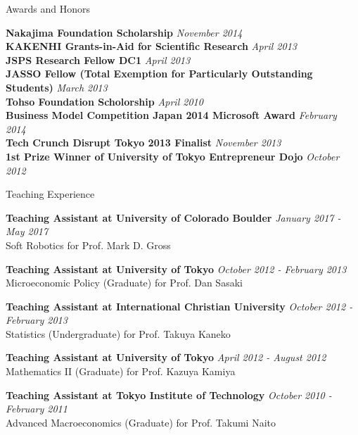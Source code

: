 \documentclass{resume} %
\begin{document}
\begin{rSection}{Awards and Honors}

{\bf Nakajima Foundation Scholarship} \hfill {\em November 2014} \\
{\bf KAKENHI Grants-in-Aid for Scientific Research} \hfill {\em April 2013} \\
{\bf JSPS Research Fellow DC1} \hfill {\em April 2013} \\
{\bf JASSO Fellow (Total Exemption for Particularly Outstanding Students) } \hfill {\em March 2013} \\
{\bf Tohso Foundation Scholorship} \hfill {\em April 2010} \\

{\bf Business Model Competition Japan 2014 Microsoft Award} \hfill {\em February 2014} \\
{\bf Tech Crunch Disrupt Tokyo 2013 Finalist} \hfill {\em November 2013} \\
{\bf 1st Prize Winner of University of Tokyo Entrepreneur Dojo} \hfill {\em October 2012} \\
\end{rSection}


\begin{rSection}{Teaching Experience}

{\bf Teaching Assistant at University of Colorado Boulder} \hfill {\em January 2017 - May 2017} \\
Soft Robotics for Prof. Mark D. Gross

{\bf Teaching Assistant at University of Tokyo} \hfill {\em October 2012 - February 2013} \\
Microeconomic Policy (Graduate) for Prof. Dan Sasaki

{\bf Teaching Assistant at International Christian University} \hfill {\em October 2012 - February 2013} \\
Statistics (Undergraduate) for Prof. Takuya Kaneko

{\bf Teaching Assistant at University of Tokyo} \hfill {\em April 2012 - August 2012} \\
Mathematics II (Graduate) for Prof. Kazuya Kamiya

{\bf Teaching Assistant at Tokyo Institute of Technology} \hfill {\em October 2010 - February 2011} \\
Advanced Macroeconomics (Graduate) for Prof. Takumi Naito

\end{rSection}
\end{document}
